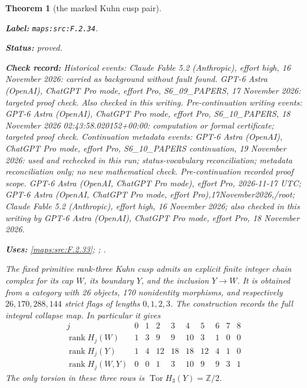 \documentclass[11pt,a4paper]{article}
\newtheorem{theorem}{Theorem}[section]
\theoremstyle{definition}
\newcommand{\StatementRecord}[4]{\par\smallskip\begingroup\upshape\raggedright\noindent\textbf{Label:} \nolinkurl{#1}.\par\noindent\textbf{Status:} #2.\par\noindent\textbf{Check record:} #3.\par\noindent\textbf{Uses:} #4.\par\endgroup\smallskip}
\begin{document}
\begin{theorem}[the marked Kuhn cusp pair]\label{maps:src:F.2.34}
\StatementRecord{maps:src:F.2.34}{proved}{Historical events: Claude Fable 5.2 (Anthropic), effort high, 16 November 2026: carried as background without fault found. GPT-6 Astra (OpenAI), ChatGPT Pro mode, effort Pro, S6\_09\_PAPERS, 17 November 2026: targeted proof check. Also checked in this writing. Pre-continuation writing events: GPT-6 Astra (OpenAI), ChatGPT Pro mode, effort Pro, S6\_10\_PAPERS, 18 November 2026 02:43:58.020152+00:00: computation or formal certificate; targeted proof check. Continuation metadata events: GPT-6 Astra (OpenAI), ChatGPT Pro mode, effort Pro, S6\_10\_PAPERS continuation, 19 November 2026: used and rechecked in this run; status-vocabulary reconciliation; metadata reconciliation only; no new mathematical check. \emph{Pre-continuation recorded proof scope.} GPT-6 Astra (OpenAI, ChatGPT Pro mode), effort Pro, 2026-11-17 UTC; GPT-6 Astra (OpenAI, ChatGPT Pro mode, effort Pro),17November2026,/root; Claude Fable 5.2 (Anthropic), effort high, 16 November 2026; also checked in this writing by GPT-6 Astra (OpenAI), ChatGPT Pro mode, effort Pro, 18 November 2026}{\cref{maps:src:F.2.33}; \cite[Theorem 4.1.1 and Lemmas 4.1.2--4.1.3, pp.~480--482]{ffAchingerOgus20}; \cite[Theorem 8.7, pp.~57--59, and Corollary 8.8, p.~59, attached source build]{manYang26}}


The fixed primitive rank-three Kuhn cusp admits an explicit
finite integer chain complex for its cap $W$, its boundary
$Y$, and the inclusion $Y\to W$.  It is obtained from a
category with 26 objects, 170 nonidentity morphisms, and
respectively $26,170,288,144$ strict flags of lengths
$0,1,2,3$.  The construction records the full integral
collapse map.  In particular it gives
\[
\begin{array}{c|rrrrrrrrr}
j&0&1&2&3&4&5&6&7&8\\\hline
\operatorname{rank}H_j(W)&1&3&9&9&10&3&1&0&0\\
\operatorname{rank}H_j(Y)&1&4&12&18&18&12&4&1&0\\
\operatorname{rank}H_j(W,Y)&0&0&1&3&10&9&9&3&1
\end{array}                                                \tag{F.CK1}\label{maps:eq:F.CK1}
\]
The only torsion in these three rows is
$\operatorname{Tor}H_3(Y)=\mathbb Z/2$.

\end{theorem}
\end{document}
